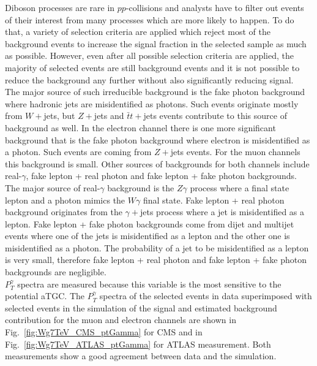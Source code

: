 Diboson processes are rare in $pp$-collisions and analysts have to filter out events of their interest from many processes which are more likely to happen. To do that, a variety of selection criteria are applied which reject most of the background events to increase the signal fraction in the selected sample as much as possible. However, even after all possible selection criteria are applied, the majority of selected events are still background events and it is not possible to reduce the background any further without also significantly reducing signal.\\
The major source of such irreducible background is the fake photon background where hadronic jets are misidentified as photons. Such events originate mostly from $W+$jets, but $Z+$jets and $\bar{t}t+$jets events contribute to this source of background as well. In the electron channel there is one more significant background that is the fake photon background where electron is misidentified as a photon.  Such events are coming from $Z+$jets events. For the muon channels this background is small. Other sources of backgrounds for both channels include real-$\gamma$, fake lepton + real photon and fake lepton + fake photon backgrounds. The major source of real-$\gamma$ background is the $Z\gamma$ process where a final state lepton and a photon mimics the $W\gamma$ final state. Fake lepton + real photon background originates from the $\gamma+$jets process where a jet is misidentified as a lepton. Fake lepton + fake photon backgrounds come from dijet and multijet events where one of the jets is misidentified as a lepton and the other one is misidentified as a photon. The probability of a jet to be misidentified as a lepton is very small, therefore fake lepton + real photon and fake lepton + fake photon backgrounds are negligible.\\
$P_T^\gamma$ spectra are measured because this variable is the most sensitive to the potential aTGC. The $P_T^\gamma$ spectra of the selected events in data superimposed with selected events in the simulation of the signal and estimated background contribution for the muon and electron channels are shown in Fig.~\ref{fig:Wg7TeV_CMS_ptGamma} for CMS and in Fig.~\ref{fig:Wg7TeV_ATLAS_ptGamma} for ATLAS measurement. Both measurements show a good agreement between data and the simulation.\\
